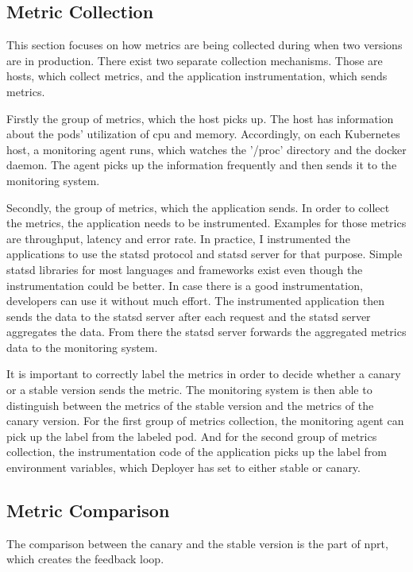 \subsection{Metric Collection}

This section focuses on how metrics are being collected during when two versions are in
production. There exist two separate collection mechanisms. Those are hosts, which collect
metrics, and the application instrumentation, which sends metrics.

Firstly the group of metrics, which the host picks up. The host has information about the
pods' utilization of cpu and memory. Accordingly, on each Kubernetes host, a monitoring
agent runs, which watches the '/proc' directory and the docker daemon. The agent picks up
the information frequently and then sends it to the monitoring system.

Secondly, the group of metrics, which the application sends. In order to collect the
metrics, the application needs to be instrumented. Examples for those metrics are
throughput, latency and error rate. In practice, I instrumented the applications to use the
statsd protocol and statsd server for that purpose. Simple statsd libraries for most
languages and frameworks exist even though the instrumentation could be better. In case
there is a good instrumentation, developers can use it without much effort. The
instrumented application then sends the data to the statsd server after each request and
the statsd server aggregates the data. From there the statsd server forwards the
aggregated metrics data to the monitoring system.

It is important to correctly label the metrics in order to decide whether a canary or a
stable version sends the metric. The monitoring system is then able to distinguish between
the metrics of the stable version and the metrics of the canary version. For the first
group of metrics collection, the monitoring agent can pick up the label from the labeled
pod. And for the second group of metrics collection, the instrumentation code of the
application picks up the label from environment variables, which Deployer has set to
either stable or canary.

\subsection{Metric Comparison}
\label{sec:metric_comparison}

The comparison between the canary and the stable version is the part of \gls{nprt}, which
creates the feedback loop.

